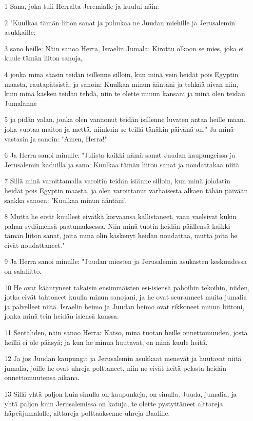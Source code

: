 \par 1 Sana, joka tuli Herralta Jeremialle ja kuului näin:
\par 2 "Kuulkaa tämän liiton sanat ja puhukaa ne Juudan miehille ja Jerusalemin asukkaille;
\par 3 sano heille: Näin sanoo Herra, Israelin Jumala: Kirottu olkoon se mies, joka ei kuule tämän liiton sanoja,
\par 4 jonka minä sääsin teidän isillenne silloin, kun minä vein heidät pois Egyptin maasta, rautapätsistä, ja sanoin: Kuulkaa minun ääntäni ja tehkää aivan niin, kuin minä käsken teidän tehdä, niin te olette minun kansani ja minä olen teidän Jumalanne
\par 5 ja pidän valan, jonka olen vannonut teidän isillenne luvaten antaa heille maan, joka vuotaa maitoa ja mettä, niinkuin se teillä tänäkin päivänä on." Ja minä vastasin ja sanoin: "Amen, Herra!"
\par 6 Ja Herra sanoi minulle: "Julista kaikki nämä sanat Juudan kaupungeissa ja Jerusalemin kaduilla ja sano: Kuulkaa tämän liiton sanat ja noudattakaa niitä.
\par 7 Sillä minä varoittamalla varoitin teidän isiänne silloin, kun minä johdatin heidät pois Egyptin maasta, ja olen varoittanut varhaisesta alkaen tähän päivään saakka sanoen: 'Kuulkaa minun ääntäni'.
\par 8 Mutta he eivät kuulleet eivätkä korvaansa kallistaneet, vaan vaelsivat kukin pahan sydämensä paatumuksessa. Niin minä tuotin heidän päällensä kaikki tämän liiton sanat, joita minä olin käskenyt heidän noudattaa, mutta joita he eivät noudattaneet."
\par 9 Ja Herra sanoi minulle: "Juudan miesten ja Jerusalemin asukasten keskuudessa on salaliitto.
\par 10 He ovat kääntyneet takaisin ensimmäisten esi-isiensä pahoihin tekoihin, niiden, jotka eivät tahtoneet kuulla minun sanojani, ja he ovat seuranneet muita jumalia ja palvelleet niitä. Israelin heimo ja Juudan heimo ovat rikkoneet minun liittoni, jonka minä tein heidän isiensä kanssa.
\par 11 Sentähden, näin sanoo Herra: Katso, minä tuotan heille onnettomuuden, josta heillä ei ole pääsyä; ja kun he minua huutavat, en minä kuule heitä.
\par 12 Ja jos Juudan kaupungit ja Jerusalemin asukkaat menevät ja huutavat niitä jumalia, joille he ovat uhreja polttaneet, niin ne eivät heitä pelasta heidän onnettomuutensa aikana.
\par 13 Sillä yhtä paljon kuin sinulla on kaupunkeja, on sinulla, Juuda, jumalia, ja yhtä paljon kuin Jerusalemissa on katuja, te olette pystyttäneet alttareja häpeäjumalalle, alttareja polttaaksenne uhreja Baalille.
